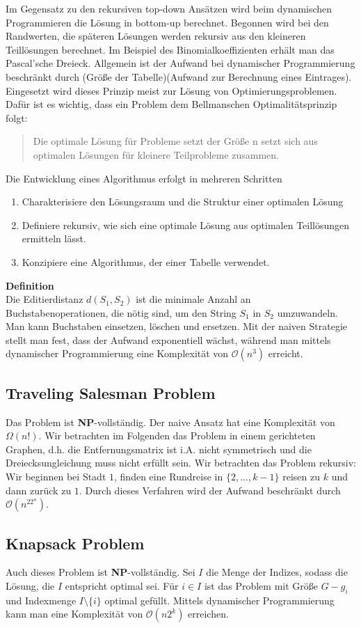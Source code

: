 \documentclass[a4paper, 12pt]{article}
\begin{document}
	Im Gegensatz zu den rekursiven top-down Ansätzen wird beim dynamischen Programmieren die Lösung in bottom-up berechnet. Begonnen wird bei den Randwerten, die späteren Lösungen werden rekursiv aus den kleineren Teillösungen berechnet. Im Beispiel des Binomialkoeffizienten erhält man das Pascal'sche Dreieck. Allgemein ist der Aufwand bei dynamischer Programmierung beschränkt durch (Größe der Tabelle)(Aufwand zur Berechnung eines Eintrages). Eingesetzt wird dieses Prinzip meist zur Lösung von Optimierungsproblemen. Dafür ist es wichtig, dass ein Problem dem Bellmanschen Optimalitätsprinzip folgt: \begin{quote}
		Die optimale Lösung für Probleme setzt der Größe n setzt sich aus optimalen Lösungen für kleinere Teilprobleme zusammen.
	\end{quote}
	Die Entwicklung eines Algorithmus erfolgt in mehreren Schritten \begin{enumerate}
		\item Charakterisiere den Lösungsraum und die Struktur einer optimalen Lösung
		\item Definiere rekursiv, wie sich eine optimale Lösung aus optimalen Teillösungen ermitteln lässt.
		\item Konzipiere eine Algorithmus, der einer Tabelle verwendet.
	\end{enumerate}
	\textbf{Definition}\\
	Die Editierdistanz $d(S_1, S_2)$ ist die minimale Anzahl an Buchstabenoperationen, die nötig sind, um den String $S_1$ in $S_2$ umzuwandeln. Man kann Buchstaben einsetzen, löschen und ersetzen. Mit der naiven Strategie stellt man fest, dass der Aufwand exponentiell wächst, während man mittels dynamischer Programmierung eine Komplexität von $\mathcal{O}(n^3)$ erreicht.\\
	\subsection{Traveling Salesman Problem}
	Das Problem ist \textbf{NP}-vollständig. Der naive Ansatz hat eine Komplexität von $\Omega(n!)$. Wir betrachten im Folgenden das Problem in einem gerichteten Graphen, d.h. die Entfernungsmatrix ist i.A. nicht symmetrisch und die Dreiecksungleichung muss nicht erfüllt sein. Wir betrachten das Problem rekursiv: Wir beginnen bei Stadt $1$, finden eine Rundreise in $\{2,...,k-1\}$ reisen zu $k$ und dann zurück zu $1$. Durch dieses Verfahren wird der Aufwand beschränkt durch $\mathcal{O}(n^22^n)$.
	\subsection{Knapsack Problem}
	Auch dieses Problem ist \textbf{NP}-vollständig. Sei $I$ die Menge der Indizes, sodass die Lösung, die $I$ entspricht optimal sei. Für $i \in I$ ist das Problem mit Größe $G-g_i$ und Indexmenge $I\setminus\{i\}$ optimal gefüllt. Mittels dynamischer Programmierung kann man eine Komplexität von $\mathcal{O}(n2^k)$ erreichen.  
\end{document}
